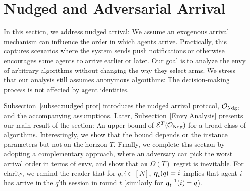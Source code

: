 \section{Nudged and Adversarial Arrival}
\label{sec:nudge}
In this section, we address nudged arrival: We assume an exogenous arrival mechanism can influence the order in which agents arrive. Practically, this captures scenarios where the system sends push notifications or otherwise encourages some agents to arrive earlier or later. Our goal is to analyze the envy of arbitrary algorithms without changing the way they select arms. We stress that our analysis still assumes anonymous algorithms: The decision-making process is not affected by agent identities.

Subsection~\ref{subsec:nudged prot} introduces the nudged arrival protocol, $\mathcal O_{\textnormal{Ndg}}$, and the accompanying assumptions. Later,  Subsection~\ref{Envy Analysis} presents our main result of the section: An upper bound of $\mathcal{E}^T({\mathcal O_{\textnormal{Ndg}}})$ for a broad class of algorithms. Interestingly, we show that the bound depends on the instance parameters but not on the horizon $T$. Finally, we complete this section by adopting a complementary approach, where an adversary can pick the worst arrival order in terms of envy, and show that an $\Omega(T)$ regret is inevitable. For clarity, we remind the reader that for $q,i\in [N]$, $\boldsymbol{\eta}_t (q)=i$ implies that agent $i$ has arrive in the $q$'th session in round $t$ (similarly for $\boldsymbol{\eta}_t^{-1}(i)=q$). 
